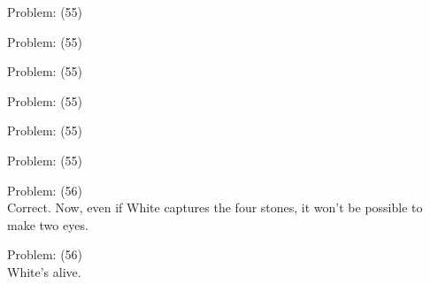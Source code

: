 \documentclass[11pt]{article}
\begin{document}
\begin{minipage}[t]{0.5\textwidth}
  {\centering
  
Problem: (55)\\
  }
\end{minipage}
\begin{minipage}[t]{0.5\textwidth}
  {\centering
  
Problem: (55)\\
  }
\end{minipage}
\begin{minipage}[t]{0.5\textwidth}
  {\centering
  
Problem: (55)\\
  }
\end{minipage}
\begin{minipage}[t]{0.5\textwidth}
  {\centering
  
Problem: (55)\\
  }
\end{minipage}
\begin{minipage}[t]{0.5\textwidth}
  {\centering
  
Problem: (55)\\
  }
\end{minipage}
\begin{minipage}[t]{0.5\textwidth}
  {\centering
  
Problem: (55)\\
  }
\end{minipage}
\begin{minipage}[t]{0.5\textwidth}
  {\centering
  
Problem: (56)\\
Correct. Now, even if White captures the four stones, it won't be possible to make two eyes.\\
  }
\end{minipage}
\begin{minipage}[t]{0.5\textwidth}
  {\centering
  
Problem: (56)\\
White's alive.\\
  }
\end{minipage}
\end{document}
